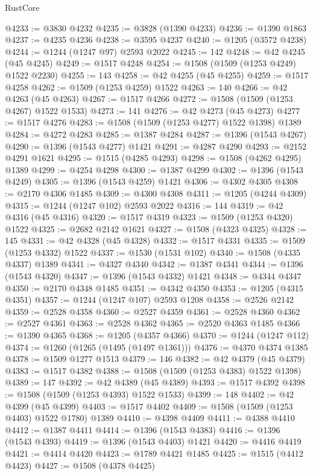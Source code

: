 \begin{lexlean}{RustCore}
\begin{coremodule}
@4233 := @3830 @4232
@4235 := @3828 (@1390 @4233)
@4236 := @1390 @1863
@4237 := @4235 @4236
@4238 := @3595 @4237
@4240 := @1205 (@3572 @4238)
@4244 := @1244 (@1247 @97) @2593 @2022
@4245 := 142
@4248 := @42 @4245 (@45 @4245)
@4249 := @1517 @4248
@4254 := @1508 (@1509 (@1253 @4249) @1522 @2230)
@4255 := 143
@4258 := @42 @4255 (@45 @4255)
@4259 := @1517 @4258
@4262 := @1509 (@1253 @4259) @1522
@4263 := 140
@4266 := @42 @4263 (@45 @4263)
@4267 := @1517 @4266
@4272 := @1508 (@1509 (@1253 @4267) @1522 @1533)
@4273 := 141
@4276 := @42 @4273 (@45 @4273)
@4277 := @1517 @4276
@4283 := @1508 (@1509 (@1253 @4277) @1522 @1398) @1389
@4284 := @4272 @4283
@4285 := @1387 @4284
@4287 := @1396 (@1543 @4267)
@4290 := @1396 (@1543 @4277) @1421
@4291 := @4287 @4290
@4293 := @2152 @4291 @1621
@4295 := @1515 (@4285 @4293)
@4298 := @1508 (@4262 @4295) @1389
@4299 := @4254 @4298
@4300 := @1387 @4299
@4302 := @1396 (@1543 @4249)
@4305 := @1396 (@1543 @4259) @1421
@4306 := @4302 @4305
@4308 := @2170 @4306 @1485
@4309 := @4300 @4308
@4311 := @1205 (@4244 @4309)
@4315 := @1244 (@1247 @102) @2593 @2022
@4316 := 144
@4319 := @42 @4316 (@45 @4316)
@4320 := @1517 @4319
@4323 := @1509 (@1253 @4320) @1522
@4325 := @2682 @2142 @1621
@4327 := @1508 (@4323 @4325)
@4328 := 145
@4331 := @42 @4328 (@45 @4328)
@4332 := @1517 @4331
@4335 := @1509 (@1253 @4332) @1522
@4337 := @1530 (@1531 @102)
@4340 := @1508 (@4335 @4337) @1389
@4341 := @4327 @4340
@4342 := @1387 @4341
@4344 := @1396 (@1543 @4320)
@4347 := @1396 (@1543 @4332) @1421
@4348 := @4344 @4347
@4350 := @2170 @4348 @1485
@4351 := @4342 @4350
@4353 := @1205 (@4315 @4351)
@4357 := @1244 (@1247 @107) @2593 @1208
@4358 := @2526 @2142
@4359 := @2528 @4358
@4360 := @2527 @4359
@4361 := @2528 @4360
@4362 := @2527 @4361
@4363 := @2528 @4362
@4365 := @2520 @4363 @1485
@4366 := @1390 @4365
@4368 := @1205 (@4357 @4366)
@4370 := @1244 (@1247 @112)
@4374 := @1260 (@1265 (@1495 (@1497 @1361)))
@4376 := @4370 @4374 @1385
@4378 := @1509 @1277 @1513
@4379 := 146
@4382 := @42 @4379 (@45 @4379)
@4383 := @1517 @4382
@4388 := @1508 (@1509 (@1253 @4383) @1522 @1398)
@4389 := 147
@4392 := @42 @4389 (@45 @4389)
@4393 := @1517 @4392
@4398 := @1508 (@1509 (@1253 @4393) @1522 @1533)
@4399 := 148
@4402 := @42 @4399 (@45 @4399)
@4403 := @1517 @4402
@4409 := @1508 (@1509 (@1253 @4403) @1522 @1780) @1389
@4410 := @4398 @4409
@4411 := @4388 @4410
@4412 := @1387 @4411
@4414 := @1396 (@1543 @4383)
@4416 := @1396 (@1543 @4393)
@4419 := @1396 (@1543 @4403) @1421
@4420 := @4416 @4419
@4421 := @4414 @4420
@4423 := @1789 @4421 @1485
@4425 := @1515 (@4412 @4423)
@4427 := @1508 (@4378 @4425)

\end{coremodule}
\end{lexlean}
